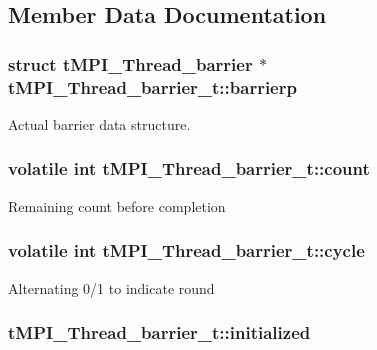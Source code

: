 \subsection{\-Member \-Data \-Documentation}
\hypertarget{structtMPI__Thread__barrier__t_a5ab0b29030c34815aebcf5ffa473da94}{
\subsubsection[{barrierp}]{\setlength{\rightskip}{0pt plus 5cm}struct {\bf t\-M\-P\-I\-\_\-\-Thread\-\_\-barrier} $\ast$ {\bf t\-M\-P\-I\-\_\-\-Thread\-\_\-barrier\-\_\-t\-::barrierp}}}\label{structtMPI__Thread__barrier__t_a5ab0b29030c34815aebcf5ffa473da94}
\-Actual barrier data structure. \hypertarget{structtMPI__Thread__barrier__t_af149a62c5428560120715ee46deaa387}{
\subsubsection[{count}]{\setlength{\rightskip}{0pt plus 5cm}volatile int {\bf t\-M\-P\-I\-\_\-\-Thread\-\_\-barrier\-\_\-t\-::count}}}\label{structtMPI__Thread__barrier__t_af149a62c5428560120715ee46deaa387}
\-Remaining count before completion \hypertarget{structtMPI__Thread__barrier__t_ab539784dad836102168a2ae13341c9f1}{
\subsubsection[{cycle}]{\setlength{\rightskip}{0pt plus 5cm}volatile int {\bf t\-M\-P\-I\-\_\-\-Thread\-\_\-barrier\-\_\-t\-::cycle}}}\label{structtMPI__Thread__barrier__t_ab539784dad836102168a2ae13341c9f1}
\-Alternating 0/1 to indicate round \hypertarget{structtMPI__Thread__barrier__t_a56df7eb38ea75c2306d16551f29aca3e}{
\subsubsection[{initialized}]{ {\bf t\-M\-P\-I\-\_\-\-Thread\-\_\-barrier\-\_\-t\-::initialized}}}\label{structtMPI__Thread__barrier__t_a56df7eb38ea75c2306d16551f29aca3e}
